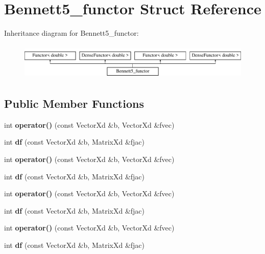 \hypertarget{struct_bennett5__functor}{}\section{Bennett5\+\_\+functor Struct Reference}
\label{struct_bennett5__functor}
Inheritance diagram for Bennett5\+\_\+functor\+:\begin{figure}[H]
\begin{center}
\leavevmode
\includegraphics[height=1.728395cm]{struct_bennett5__functor}
\end{center}
\end{figure}
\subsection*{Public Member Functions}
\begin{DoxyCompactItemize}
\item 
\mbox{\label{struct_bennett5__functor_ae94b09aba3f92d2cd036f81a0af14702}} 
int {\bfseries operator()} (const Vector\+Xd \&b, Vector\+Xd \&fvec)
\item 
\mbox{\label{struct_bennett5__functor_a4fbfe9e83818f73c25994ed19cc00f90}} 
int {\bfseries df} (const Vector\+Xd \&b, Matrix\+Xd \&fjac)
\item 
\mbox{\label{struct_bennett5__functor_ae94b09aba3f92d2cd036f81a0af14702}} 
int {\bfseries operator()} (const Vector\+Xd \&b, Vector\+Xd \&fvec)
\item 
\mbox{\label{struct_bennett5__functor_a4fbfe9e83818f73c25994ed19cc00f90}} 
int {\bfseries df} (const Vector\+Xd \&b, Matrix\+Xd \&fjac)
\item 
\mbox{\label{struct_bennett5__functor_ae94b09aba3f92d2cd036f81a0af14702}} 
int {\bfseries operator()} (const Vector\+Xd \&b, Vector\+Xd \&fvec)
\item 
\mbox{\label{struct_bennett5__functor_a4fbfe9e83818f73c25994ed19cc00f90}} 
int {\bfseries df} (const Vector\+Xd \&b, Matrix\+Xd \&fjac)
\item 
\mbox{\label{struct_bennett5__functor_ae94b09aba3f92d2cd036f81a0af14702}} 
int {\bfseries operator()} (const Vector\+Xd \&b, Vector\+Xd \&fvec)
\item 
\mbox{\label{struct_bennett5__functor_a4fbfe9e83818f73c25994ed19cc00f90}} 
int {\bfseries df} (const Vector\+Xd \&b, Matrix\+Xd \&fjac)
\end{DoxyCompactItemize}
